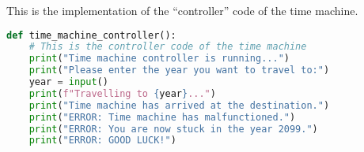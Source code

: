 This is the implementation of the ``controller'' code of the time machine.

\begin{lstlisting}[language=Python, caption=Time Machine Demo]
def time_machine_controller():
    # This is the controller code of the time machine
    print("Time machine controller is running...")
    print("Please enter the year you want to travel to:")
    year = input()
    print(f"Travelling to {year}...")
    print("Time machine has arrived at the destination.")
    print("ERROR: Time machine has malfunctioned.")
    print("ERROR: You are now stuck in the year 2099.")
    print("ERROR: GOOD LUCK!")
\end{lstlisting}



